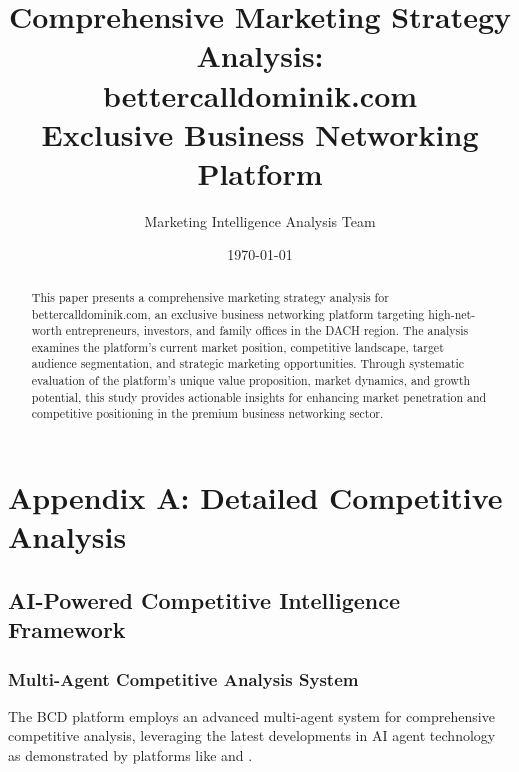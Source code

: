 \documentclass[12pt,a4paper]{book}
\title{\textbf{Comprehensive Marketing Strategy Analysis:\\
bettercalldominik.com\\
Exclusive Business Networking Platform}}
\author{Marketing Intelligence Analysis Team}
\date{\today}
\begin{document}
\frontmatter

\maketitle

\begin{abstract}
This paper presents a comprehensive marketing strategy analysis for bettercalldominik.com, an exclusive business networking platform targeting high-net-worth entrepreneurs, investors, and family offices in the DACH region. The analysis examines the platform's current market position, competitive landscape, target audience segmentation, and strategic marketing opportunities. Through systematic evaluation of the platform's unique value proposition, market dynamics, and growth potential, this study provides actionable insights for enhancing market penetration and competitive positioning in the premium business networking sector.
\end{abstract}

\tableofcontents
\listoffigures
\listoftables

\mainmatter










\backmatter




\appendix

\chapter{Appendix A: Detailed Competitive Analysis}

\section{AI-Powered Competitive Intelligence Framework}

\subsection{Multi-Agent Competitive Analysis System}

The BCD platform employs an advanced multi-agent system for comprehensive competitive analysis, leveraging the latest developments in AI agent technology as demonstrated by platforms like \citep{reiff_multiagent_sophisticated_system} and \citep{venugopal_containerized_microservices_architecture}.
\end{document}

